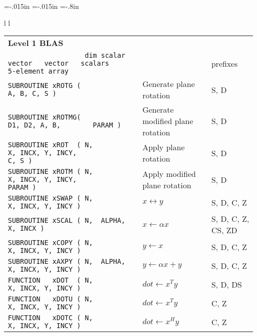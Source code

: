%
%
\setlength{\parindent}{0in}
\setlength{\parskip}{0.1in}
\oddsidemargin=-.015in
\evensidemargin=-.015in
\textwidth=10in
\topmargin=-1.2in
\textheight=7.4in
\hoffset=-.8in



\scriptsize

\begin{tabular}{ l l }
\begin{tabular}{ l l l }
{\small\bf Level 1 BLAS}\\
\verb+                   dim scalar vector   vector   scalars              5-element array+ &
                        & prefixes \\
\verb+SUBROUTINE xROTG (                                      A, B, C, S )+ &
      Generate plane rotation & S, D \\
\verb+SUBROUTINE xROTMG(                              D1, D2, A, B,        PARAM )+ &
                       Generate modified plane rotation & S, D \\
\verb+SUBROUTINE xROT  ( N,         X, INCX, Y, INCY,               C, S )+ &
                       Apply plane rotation & S, D \\
\verb+SUBROUTINE xROTM ( N,         X, INCX, Y, INCY,                      PARAM )+ &
                       Apply modified plane rotation & S, D \\
\verb+SUBROUTINE xSWAP ( N,         X, INCX, Y, INCY )+ &
                       $ x \leftrightarrow y $ & S, D, C, Z \\
\verb+SUBROUTINE xSCAL ( N,  ALPHA, X, INCX )+ &
                       $ x \leftarrow \alpha x $ & S, D, C, Z, CS, ZD \\
\verb+SUBROUTINE xCOPY ( N,         X, INCX, Y, INCY )+ &
                       $ y \leftarrow x $ & S, D, C, Z \\
\verb+SUBROUTINE xAXPY ( N,  ALPHA, X, INCX, Y, INCY )+ &
                       $ y \leftarrow \alpha x + y $ & S, D, C, Z \\
\verb+FUNCTION   xDOT  ( N,         X, INCX, Y, INCY )+ &
                       $ dot \leftarrow x ^ {T} y $ & S, D, DS \\
\verb+FUNCTION   xDOTU ( N,         X, INCX, Y, INCY )+ &
                       $ dot \leftarrow x ^ {T} y $ & C, Z \\
\verb+FUNCTION   xDOTC ( N,         X, INCX, Y, INCY )+ &
                       $ dot \leftarrow x ^ {H} y $ & C, Z \\

\end{tabular}
\end{tabular}

